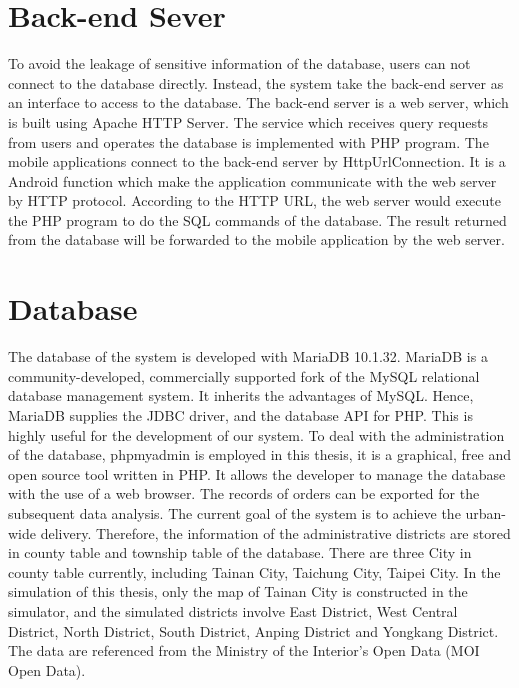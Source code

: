 \documentclass[12pt]{ksthesis}
\begin{document}
\begin{thesis}
{\section{Back-end Sever}
To avoid the leakage of sensitive information of the database, users can not connect to the database directly. Instead, the system take the back-end server as an interface to access to the database. The back-end server is a web server, which is built using Apache HTTP Server. The service which receives query requests from users and operates the database is implemented with PHP program. 
The mobile applications connect to the back-end server by HttpUrlConnection. It is a Android function which make the application communicate with the web server by HTTP protocol. According to the HTTP URL, the web server would execute the PHP program to do the SQL commands of the database. The result returned from the database will be forwarded to the mobile application by the web server. 

\section{Database}
The database of the system is developed with MariaDB 10.1.32. MariaDB is a community-developed, commercially supported fork of the MySQL relational database management system. It inherits the advantages of MySQL. Hence, MariaDB supplies the JDBC driver, and the database API for PHP. This is highly useful for the development of our system. To deal with the administration of the database, phpmyadmin is employed in this thesis, it is a graphical, free and open source tool written in PHP. It allows the developer to manage the database with the use of a web browser. The records of orders can be exported for the subsequent data analysis.
The current goal of the system is to  achieve the urban-wide delivery. Therefore, the information of the administrative districts are stored in county table and township table of the database. There are three City in county table currently, including Tainan City, Taichung City, Taipei City. In the simulation of this thesis, only the map of Tainan City is constructed in the simulator, and the simulated districts involve East District, West Central District, North District, South District, Anping District and Yongkang District. The data are referenced from the Ministry of the Interior’s Open Data (MOI Open Data).







}
\end{thesis}
\end{document}
